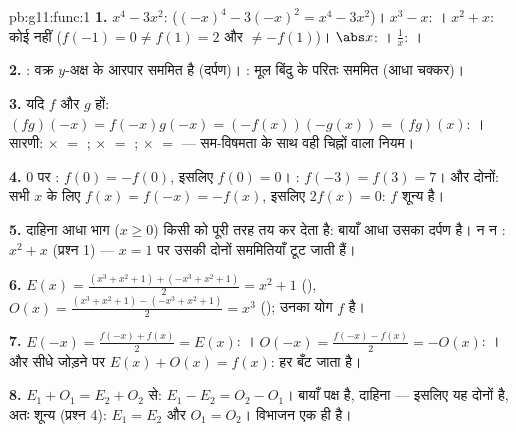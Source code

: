 \begin{solution}{pb:g11:func:1}
\textbf{1.} $x^4 - 3x^2$:  ($(-x)^4 - 3(-x)^2 = x^4 -
3x^2$)। $x^3 - x$: । $x^2 + x$: कोई नहीं ($f(-1) = 0 \neq
f(1) = 2$ और
$\neq -f(1)$)। $\abs x$: । $\frac1x$: ।

\textbf{2.} : वक्र $y$-अक्ष के आरपार सममित है (दर्पण)। : मूल बिंदु
के परितः सममित (आधा चक्कर)।

\textbf{3.} यदि $f$ और $g$  हों: $(fg)(-x) = f(-x)g(-x) = (-f(x))(-g(x)) = (fg)(x)$: । सारणी:  $\times$  $=$
;  $\times$  $=$ ;  $\times$  $=$  --- सम-विषमता के साथ
वही चिह्नों वाला नियम।

\textbf{4.} $0$ पर : $f(0) = -f(0)$, इसलिए $f(0) = 0$। : $f(-3) = f(3) = 7$।  और  दोनों:
सभी $x$ के लिए $f(x) = f(-x) = -f(x)$, इसलिए $2f(x) = 0$: $f$ शून्य  है।

\textbf{5.} दाहिना आधा भाग ($x \geq 0$) किसी  को पूरी तरह तय कर देता है:
बायाँ आधा उसका दर्पण है। न  न : $x^2 + x$ (प्रश्न 1) --- $x = 1$ पर उसकी
दोनों सममितियाँ टूट जाती हैं।

\textbf{6.} $E(x) = \frac{(x^3 + x^2 + 1) + (-x^3 + x^2 +
1)}{2} = x^2 + 1$ (), $O(x) = \frac{(x^3 + x^2 + 1) -
(-x^3 + x^2 + 1)}{2} = x^3$ (); उनका योग $f$ है।

\textbf{7.} $E(-x) = \frac{f(-x) + f(x)}{2} = E(x)$: । $O(-x) = \frac{f(-x) - f(x)}{2} = -O(x)$: । और सीधे जोड़ने पर $E(x) + O(x) = f(x)$: हर  बँट जाता
है।

\textbf{8.} $E_1 + O_1 = E_2 + O_2$ से: $E_1 - E_2 = O_2 - O_1$। बायाँ पक्ष  है, दाहिना  --- इसलिए यह 
दोनों है, अतः शून्य (प्रश्न 4): $E_1 = E_2$ और $O_1 = O_2$। विभाजन एक ही है।


\end{solution}
